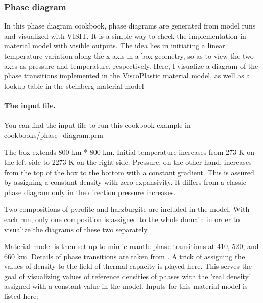 \subsubsection{Phase diagram}

\label{sec:phase-diagram}

In this phase diagram cookbook, phase diagrams are generated from model runs and visualized with VISIT. %
It is a simple way to check the implementation in material model with visible outputs.%
The idea lies in initiating a linear temperature variation along the x-axis in a box geometry, so as to view the two axes as pressure and temperature, respectively. %
Here, I visualize a diagram of the phase transitions implemented in the ViscoPlastic material model, as well as a lookup table in the steinberg material model%

\paragraph{The input file.}
You can find the input file to run this cookbook example in \url{cookbooks/phase_diagram.prm}

\par The box extends 800 km * 800 km. %
Initial temperature increases from 273 K on the left side to 2273 K on the right side. %
Pressure, on the other hand, increases from the top of the box to the bottom with a constant gradient.
This is assured by assigning a constant density with zero expansivity.
It differs from a classic phase diagram only in the direction pressure increases.

\par Two compositions of pyrolite and harzburgite are included in the model. %
With each run, only one composition is assigned to the whole domain in order to visualize the diagrams of these two separately.

\par Material model is then set up to mimic mantle phase transitions at 410, 520, and 660 km.%
Details of phase transitions are taken from \cite{billen2018decoupling}.
A trick of assigning the values of density to the field of thermal capacity is played here. %
This serves the goal of visualizing values of reference densities of phases with the 'real density' assigned with a constant value in the model.
Inputs for this material model is listed here:



